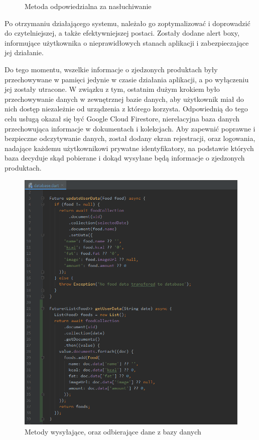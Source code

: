 \documentclass[12pt, a4paper]{article}
\begin{document}
\begin{sloppypar}
{\begin{figure}[H]
    \caption{Metoda odpowiedzialna za nasłuchiwanie}
    \label{fig:app4}
  \end{figure}
  Po otrzymaniu działającego systemu, należało go zoptymalizować i doprowadzić do czytelniejszej,
  a także efektywniejszej postaci. Zostały dodane alert boxy, informujące użytkownika
  o nieprawidłowych stanach aplikacji i zabezpieczające jej działanie.

  Do tego momentu, wszelkie informacje o zjedzonych produktach były przechowywane w pamięci
  jedynie w czasie działania aplikacji, a po wyłączeniu jej zostały utracone. W związku z tym,
  ostatnim dużym krokiem było przechowywanie danych w zewnętrznej bazie danych, aby
  użytkownik miał do nich dostęp niezależnie od urządzenia z którego korzysta. Odpowiednią
  do tego celu usługą okazał się być Google Cloud Firestore, nierelacyjna baza danych
  przechowująca informacje w dokumentach i kolekcjach. Aby zapewnić poprawne i bezpieczne
  odczytywanie danych, został dodany ekran rejestracji, oraz logowania, nadające każdemu
  użytkownikowi prywatne identyfikatory, na podstawie których baza decyduje skąd pobierane
  i dokąd wysyłane będą informacje o zjedzonych produktach.
  \begin{figure}[H]
    \centering
    \includegraphics[width=.9\textwidth]{app_dev_5.PNG}
    \caption{Metody wysyłające, oraz odbierające dane z bazy danych}
    \label{fig:app5}
  \end{figure}

}
\end{sloppypar}
\end{document}
